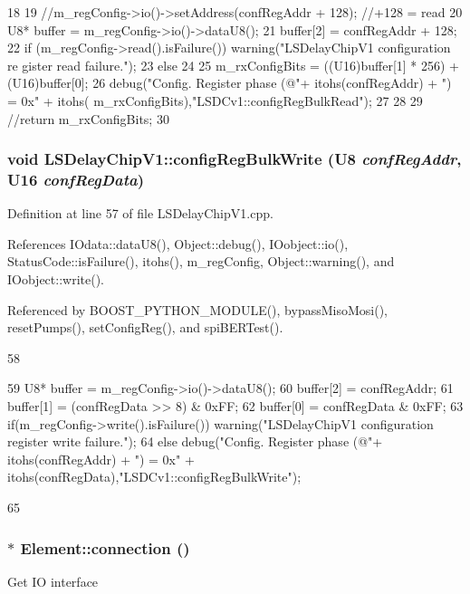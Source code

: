 \begin{DoxyCode}
18 {
19     //m_regConfig->io()->setAddress(confRegAddr + 128);     //+128 = read   
20     U8* buffer = m_regConfig->io()->dataU8();
21     buffer[2] = confRegAddr + 128;
22     if (m_regConfig->read().isFailure())  warning("LSDelayChipV1 configuration re
      gister read failure.");
23     else
24     {
25         m_rxConfigBits = ((U16)buffer[1] * 256) + (U16)buffer[0];
26         debug("Config. Register phase (@"+ itohs(confRegAddr) + ") = 0x" + itohs(
      m_rxConfigBits),"LSDCv1::configRegBulkRead");
27     }
28          
29     //return m_rxConfigBits; 
30 }
\end{DoxyCode}
\hypertarget{classLSDelayChipV1_afa626b5d52f8723bcaa3205d1cc7a0f8}{
\subsubsection[{configRegBulkWrite}]{\setlength{\rightskip}{0pt plus 5cm}void LSDelayChipV1::configRegBulkWrite ({\bf U8} {\em confRegAddr}, \/  {\bf U16} {\em confRegData})}}
\label{classLSDelayChipV1_afa626b5d52f8723bcaa3205d1cc7a0f8}


Definition at line 57 of file LSDelayChipV1.cpp.

References IOdata::dataU8(), Object::debug(), IOobject::io(), StatusCode::isFailure(), itohs(), m\_\-regConfig, Object::warning(), and IOobject::write().

Referenced by BOOST\_\-PYTHON\_\-MODULE(), bypassMisoMosi(), resetPumps(), setConfigReg(), and spiBERTest().


\begin{DoxyCode}
58 {
59     U8* buffer = m_regConfig->io()->dataU8();
60     buffer[2] = confRegAddr;
61     buffer[1] = (confRegData >> 8) & 0xFF;
62     buffer[0] =  confRegData       & 0xFF;
63     if(m_regConfig->write().isFailure())    warning("LSDelayChipV1 configuration 
      register write failure.");
64     else                                    debug("Config. Register phase (@"+ 
      itohs(confRegAddr) + ") = 0x" + itohs(confRegData),"LSDCv1::configRegBulkWrite");
      
65 }
\end{DoxyCode}
\hypertarget{classElement_af57444353c1ddf9fa0109801e97debf7}{
\subsubsection[{connection}]{ $\ast$ Element::connection ()}}
\label{classElement_af57444353c1ddf9fa0109801e97debf7}
Get IO interface 

